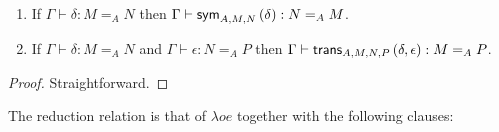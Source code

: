 \begin{lm}
$ $
\begin{enumerate}
\item
If $\Gamma \vdash \delta : M =_A N$ then $\Gamma \vdash \mathsf{sym}_{{A},{M},{N}} \left( {\delta} \right) : N =_A M$.
\item
If $\Gamma \vdash \delta : M =_A N$ and $\Gamma \vdash \epsilon : N =_A P$ then
$\Gamma \vdash \mathsf{trans}_{{A},{M},{N},{P}} \left( {\delta} , {\epsilon} \right) : M =_A P$.
\end{enumerate}
\end{lm}

\begin{proof}
Straightforward.
\end{proof}

The reduction relation is that of $\lambda o e$ together with the following clauses:

